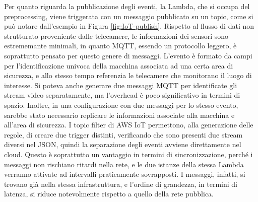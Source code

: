
Per quanto riguarda la pubblicazione degli eventi, la Lambda, che si occupa del preprocessing, viene triggerata con un messaggio pubblicato su un topic, come si può notare dall'esempio in Figura \ref{fig:IoT-publish}. Rispetto al flusso di dati non strutturato proveniente dalle telecamere, le informazioni dei sensori sono estrememante minimali, in quanto MQTT, essendo un protocollo leggero, è soprattutto pensato per questo genere di messaggi. L'evento è formato da campi per l'identificazione univoca della macchina associata ad una certa area di sicurezza, e allo stesso tempo referenzia le telecamere che monitorano il luogo di interesse. Si poteva anche generare due messaggi MQTT per identificate gli stream video separatamente, ma l'overhead è poco significativo in termini di spazio. Inoltre, in una configurazione con due messaggi per lo stesso evento, sarebbe stato necessario replicare le informazioni associate alla macchina e all'area di sicurezza. I topic filter di AWS IoT permettono, alla generazione delle regole, di creare due trigger distinti, verificando che sono presenti due stream diversi nel JSON, quindi la separazione degli eventi avviene direttamente nel cloud. Questo è soprattutto un vantaggio in termini di sincronizzazione, perché i messaggi non rischiano ritardi nella rete, e le due istanze della stessa Lambda verranno attivate ad intervalli praticamente sovrapposti. I messaggi, infatti, si trovano già nella stessa infrastruttura, e l'ordine di grandezza, in termini di latenza, si riduce notevolmente rispetto a quello della rete pubblica. %
